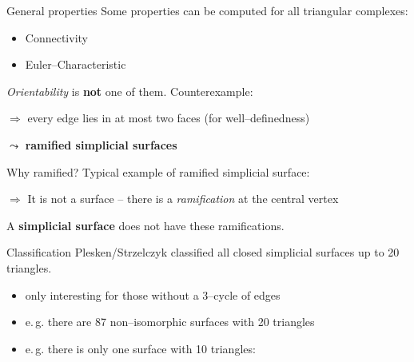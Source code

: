 \begin{frame}{General properties}
    \pause
    Some properties can be computed for all triangular complexes:
    \pause
    \begin{itemize}
        \item Connectivity
        \pause
        \item Euler--Characteristic
    \end{itemize}
    \pause
    \textit{Orientability} is \textbf{not} one of them.
    \pause
    Counterexample:
        \begin{center}
            \begin{tikzpicture}
                
	    \end{tikzpicture}
        \end{center}
    \pause
    $\Rightarrow$ every edge lies in at most two faces (for well--definedness)
    
    \pause
    $\leadsto$ \textbf{ramified simplicial surfaces}
\end{frame}


\begin{frame}{Why ramified?}
    \pause
    Typical example of ramified simplicial surface:
    \pause
    \begin{center}
        \begin{tikzpicture}
            
        \end{tikzpicture}
    \end{center}
    \pause
    $\Rightarrow$ It is not a surface -- there is a \textit{ramification} at 
        the central vertex
    
    \pause
    A \textbf{simplicial surface} does not have these ramifications.
\end{frame}


\begin{frame}{Classification}
    \pause
    Plesken/Strzelczyk classified all closed simplicial surfaces up to 20 triangles.

    \begin{itemize}
        \pause
        \item only interesting for those without a 3--cycle of edges
        \pause
        \item e.\,g. there are 87 non--isomorphic surfaces with 20 triangles
        \pause
        \item e.\,g. there is only one surface with 10 triangles:
    \end{itemize}

    \pause
    \begin{center}
    \end{center}

\end{frame}
